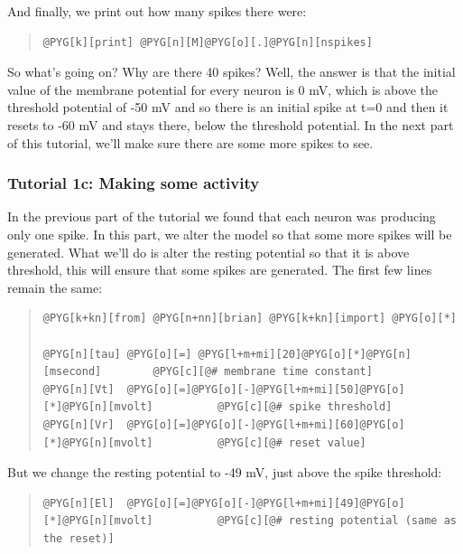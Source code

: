 \documentclass[letterpaper,10pt,english]{manual}
\begin{document}
And finally, we print out how many spikes there were:
\begin{quote}

\begin{Verbatim}[commandchars=@\[\]]
@PYG[k][print] @PYG[n][M]@PYG[o][.]@PYG[n][nspikes]
\end{Verbatim}
\end{quote}

So what's going on? Why are there 40 spikes? Well, the answer is
that the initial value of the membrane potential for every neuron
is 0 mV, which is above the threshold potential of -50 mV and so there
is an initial spike at t=0 and then it resets to -60 mV and stays there,
below the threshold potential. In the next part of this tutorial, we'll
make sure there are some more spikes to see.

\resetcurrentobjects
\hypertarget{--doc-tutorial_1c_making_some_activity}{}

\subsubsection{Tutorial 1c: Making some activity}

In the previous part of the tutorial we found that each neuron
was producing only one spike. In this part, we alter the model so
that some more spikes will be generated. What we'll do is alter
the resting potential  so that it is above threshold, this
will ensure that some spikes are generated. The first few
lines remain the same:
\begin{quote}

\begin{Verbatim}[commandchars=@\[\]]
@PYG[k+kn][from] @PYG[n+nn][brian] @PYG[k+kn][import] @PYG[o][*]

@PYG[n][tau] @PYG[o][=] @PYG[l+m+mi][20]@PYG[o][*]@PYG[n][msecond]        @PYG[c][@# membrane time constant]
@PYG[n][Vt]  @PYG[o][=]@PYG[o][-]@PYG[l+m+mi][50]@PYG[o][*]@PYG[n][mvolt]          @PYG[c][@# spike threshold]
@PYG[n][Vr]  @PYG[o][=]@PYG[o][-]@PYG[l+m+mi][60]@PYG[o][*]@PYG[n][mvolt]          @PYG[c][@# reset value]
\end{Verbatim}
\end{quote}

But we change the resting potential to -49 mV, just above the
spike threshold:
\begin{quote}

\begin{Verbatim}[commandchars=@\[\]]
@PYG[n][El]  @PYG[o][=]@PYG[o][-]@PYG[l+m+mi][49]@PYG[o][*]@PYG[n][mvolt]          @PYG[c][@# resting potential (same as the reset)]
\end{Verbatim}
\end{quote}
\end{document}
